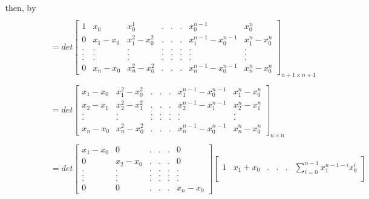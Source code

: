 \documentclass{article}
\begin{document}
\begin{enumerate}
\begin{enumerate}[(a)]
    \begin{align*}
    \text{then, by row operations we get} \\ \\
        &= det \begin{bmatrix}
            1 & x_{0} & x_{0}^{1} & . & . & . & x_{0}^{n-1} & x_{0}^{n}\\
            0 & x_{1} - x_{0} & x_{1}^{2} - x_{0}^{2} & . & . & . & x_{1}^{n-1} - x_{0}^{n-1} & x_{1}^{n} - x_{0}^{n}\\
            . & . & . & . & . & . & . & . \\
            . & . & . & . & . & . & . & . \\
            . & . & . & . & . & . & . & . \\
            0 & x_{n} - x_{0} & x_{n}^{2} - x_{0}^{2} & . & . & . & x_{n}^{n-1} - x_{0}^{n-1} & x_{n}^{n} - x_{0}^{n}
        \end{bmatrix}_{n+1 \times n+1} \\ \\
        &= det \begin{bmatrix}
            x_{1} - x_{0} & x_{1}^{2} - x_{0}^{2} & . & . & . & x_{1}^{n-1} - x_{0}^{n-1} & x_{1}^{n} - x_{0}^{n}\\
            x_{2} - x_{1} & x_{2}^{2} - x_{1}^{2} & . & . & . & x_{2}^{n-1} - x_{1}^{n-1} & x_{2}^{n} - x_{1}^{n}\\
            . & . & . & . & . & . & . \\
            . & . & . & . & . & . & . \\
            x_{n} - x_{0} & x_{n}^{2} - x_{0}^{2} & . & . & . & x_{n}^{n-1} - x_{0}^{n-1} & x_{n}^{n} - x_{0}^{n}
        \end{bmatrix}_{n \times n} \\ \\
        &= det \begin{bmatrix}
            x_{1} - x_{0} & 0 & . & . & . & 0\\
            0 & x_{2} - x_{0} & . & . & . & 0\\
            . & . & . & . & . & .\\
            . & . & . & . & . & .\\
            . & . & . & . & . & .\\
            0 & 0 & . & . & . & x_{n} - x_{0}
        \end{bmatrix}
        \begin{bmatrix}
            1 & x_{1} + x_{0} & . & . & . & \sum_{i=0}^{n-1} x_{1}^{n-1-i} x_{0}^{i}\\

\end{bmatrix}
\end{align*}
\end{enumerate}
\end{enumerate}
\end{document}
